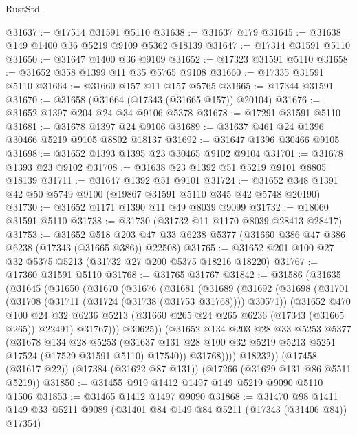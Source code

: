 \begin{lexlean}{RustStd}
\begin{coremodule}
@31637 := @17514 @31591 @5110
@31638 := @31637 @179
@31645 := @31638 @149 @1400 @36 @5219 @9109 @5362 @18139
@31647 := @17314 @31591 @5110
@31650 := @31647 @1400 @36 @9109
@31652 := @17323 @31591 @5110
@31658 := @31652 @358 @1399 @11 @35 @5765 @9108
@31660 := @17335 @31591 @5110
@31664 := @31660 @157 @11 @157 @5765
@31665 := @17344 @31591
@31670 := @31658 (@31664 (@17343 (@31665 @157)) @20104)
@31676 := @31652 @1397 @204 @24 @34 @9106 @5378
@31678 := @17291 @31591 @5110
@31681 := @31678 @1397 @24 @9106
@31689 := @31637 @461 @24 @1396 @30466 @5219 @9105 @8802 @18137
@31692 := @31647 @1396 @30466 @9105
@31698 := @31652 @1393 @1395 @23 @30465 @9102 @9104
@31701 := @31678 @1393 @23 @9102
@31708 := @31638 @23 @1392 @51 @5219 @9101 @8805 @18139
@31711 := @31647 @1392 @51 @9101
@31724 := @31652 @348 @1391 @42 @50 @5749 @9100 (@19867 @31591 @5110 @345 @42 @5748 @20190)
@31730 := @31652 @1171 @1390 @11 @49 @8039 @9099
@31732 := @18060 @31591 @5110
@31738 := @31730 (@31732 @11 @1170 @8039 @28413 @28417)
@31753 := @31652
    @518
    @203
    @47
    @33
    @6238
    @5377
    (@31660 @386 @47 @386 @6238 (@17343 (@31665 @386)) @22508)
@31765 := @31652 @201 @100 @27 @32 @5375 @5213 (@31732 @27 @200 @5375 @18216 @18220)
@31767 := @17360 @31591 @5110
@31768 := @31765 @31767
@31842 := @31586
    (@31635
      (@31645
        (@31650
          (@31670
            (@31676
              (@31681
                (@31689
                  (@31692
                    (@31698
                      (@31701 (@31708 (@31711 (@31724 (@31738 (@31753 @31768)))) @30571))
                      (@31652
                        @470
                        @100
                        @24
                        @32
                        @6236
                        @5213
                        (@31660 @265 @24 @265 @6236 (@17343 (@31665 @265)) @22491)
                        @31767)))
                  @30625))
              (@31652
                @134
                @203
                @28
                @33
                @5253
                @5377
                (@31678
                  @134
                  @28
                  @5253
                  (@31637 @131 @28 @100 @32 @5219 @5213 @5251 @17524 (@17529 @31591 @5110) @17540))
                @31768))))
        @18232))
    (@17458 (@31617 @22))
    (@17384 (@31622 @87 @131))
    (@17266 (@31629 @131 @86 @5511 @5219))
@31850 := @31455 @919 @1412 @1497 @149 @5219 @9090 @5110 @1506
@31853 := @31465 @1412 @1497 @9090
@31868 := @31470
    @98
    @1411
    @149
    @33
    @5211
    @9089
    (@31401 @84 @149 @84 @5211 (@17343 (@31406 @84)) @17354)

\end{coremodule}
\end{lexlean}
